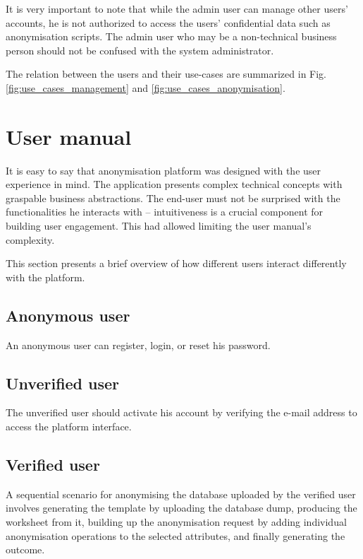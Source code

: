 \documentclass[a4paper,twoside,12pt]{book}
\begin{document}
It is very important to note that while the admin user can manage other users' accounts, he is not authorized to access the users' confidential data such as anonymisation scripts. The admin user who may be a non-technical business person should not be confused with the system administrator.

The relation between the users and their use-cases are summarized in Fig. \ref{fig:use_cases_management} and \ref{fig:use_cases_anonymisation}.

\section{User manual}

It is easy to say that anonymisation platform was designed with the user experience in mind. The application presents complex technical concepts with graspable business abstractions. The end-user must not be surprised with the functionalities he interacts with -- intuitiveness is a crucial component for building user engagement. This had allowed limiting the user manual's complexity.

This section presents a brief overview of how different users interact differently with the platform.

\subsection{Anonymous user}

An anonymous user can register, login, or reset his password.

\subsection{Unverified user}

The unverified user should activate his account by verifying the e-mail address to access the platform interface.

\subsection{Verified user}

A sequential scenario for anonymising the database uploaded by the verified user involves generating the template by uploading the database dump, producing the worksheet from it, building up the anonymisation request by adding individual anonymisation operations to the selected attributes, and finally generating the outcome.
\end{document}

